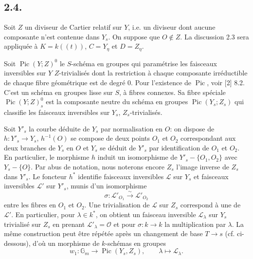 \documentclass[11pt,leqno]{article}
\DeclareMathOperator{\Pic}{Pic}
\newcommand{\OO}{\mathcal O}
\newcommand{\GG}{\mathbb G}
\begin{document}
\subsection*{2.4.}
Soit $Z$ un diviseur de Cartier relatif sur $Y$, i.e. un diviseur dont aucune composante n'est contenue dans $Y_s$. On suppose que $O\notin Z$. La discussion 2.3 sera appliquée à $K=k((t))$, $C=Y_\eta$ et $D=Z_\eta$.

Soit $\Pic(Y;Z)^0$ le $S$-schéma en groupes qui paramétrise les faisceaux inversibles sur $Y$ $Z$-trivialisés dont la restriction à chaque composante irréductible de chaque fibre géométrique est de degré 0. Pour l'existence de $\Pic$, voir [2] 8.2. C'est un schéma en groupes lisse sur $S$, à fibres connexes. Sa fibre spéciale $\Pic(Y;Z)^0_s$ est la composante neutre du schéma en groupes $\Pic(Y_s;Z_s)$ qui classifie les faisceaux inversibles sur $Y_s$, $Z_s$-trivialisés.

Soit $Y'_s$ la courbe déduite de $Y_s$ par normalisation en $O$: on dispose de $h:Y'_s\to Y_s$, $h^{-1}(O)$ se compose de deux points $O_1$ et $O_2$ correspondant aux deux branches de $Y_s$ en $O$ et $Y_s$ se déduit de $Y'_s$ par identification de $O_1$ et $O_2$. En particulier, le morphisme $h$ induit un isomorphisme de $Y'_s-\{O_1,O_2\}$ avec $Y_s-\{O\}$. Par abus de notation, nous noterons encore $Z_s$ l'image inverse de $Z_s$ dans $Y'_s$. Le foncteur $h^*$ identifie faisceaux inversibles $\mathscr L$ sur $Y_s$ et faisceaux inversibles $\mathscr L'$ sur $Y'_s$, munis d'un isomorphisme
\[
        \sigma:\mathscr L'_{O_1}\xrightarrow{\sim}\mathscr L'_{O_2}
\]
entre les fibres en $O_1$ et $O_2$. Une trivialisation de $\mathscr L$ sur $Z_s$ correspond à une de $\mathscr L'$. En particulier, pour $\lambda\in k^*$, on obtient un faisceau inversible $\mathscr L_\lambda$ sur $Y_s$ trivialisé sur $Z_s$ en prenant $\mathscr L'_\lambda=\OO$ et pour $\sigma:k\to k$ la multiplication par $\lambda$. La même construction peut être répétée après un changement de base $T\to s$ (cf. ci-dessous), d'où un morphisme de $k$-schémas en groupes
\begin{equation}
        w_1:\GG_m\longrightarrow\Pic(Y_s,Z_s),\qquad \lambda\longmapsto\mathscr L_\lambda. \tag{2.4.1}
\end{equation}
\end{document}
